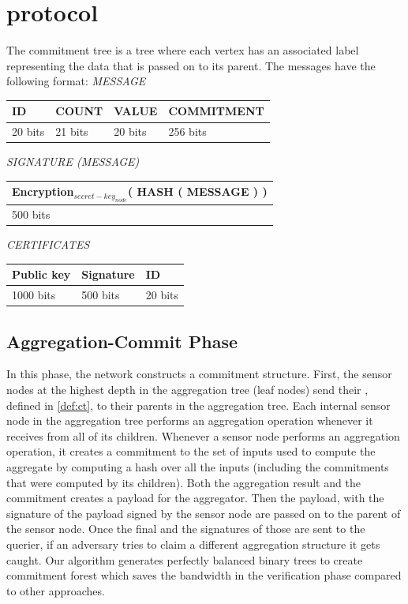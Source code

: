 \chapter{protocol}

	The commitment tree is a tree where each vertex has an associated label representing the data that is passed on to its parent. The messages have the following format: 
	\textit{MESSAGE}
	\newline
	
	\begin{tabular}{ | l | l | l | l |}
		\hline
		ID & COUNT & VALUE & COMMITMENT \\
		\hline
		20 bits & 21 bits & 20 bits & 256 bits\\
		\hline
	\end{tabular}
	\newline
	\newline
	\textit{SIGNATURE (MESSAGE)}
	\newline

	\begin{tabular}{ |l| }
		\hline
		Encryption$_{secret-key_{node}}$( HASH ( MESSAGE ) )\\
		\hline
		500 bits\\
		\hline
	\end{tabular}
	\newline
	\newline
	\textit{CERTIFICATES}
	\newline

	\begin{tabular}{ | l | l | l | }
		\hline
			Public key  & Signature & ID \\
		\hline
			1000 bits & 500 bits & 20 bits \\
		\hline

	\end{tabular}

	\newpage

\section{Aggregation-Commit Phase}
	In this phase, the network constructs a commitment structure. 
	First, the sensor nodes at the highest depth in the aggregation tree (leaf nodes) send their \payloads, defined in \ref{def:ct}, to their parents in the aggregation tree.
	Each internal sensor node in the aggregation tree performs an aggregation operation whenever it receives \payloads from all of its children.
	Whenever a sensor node performs an aggregation operation, it creates a commitment to the set of inputs used to compute the aggregate by computing a hash over all the inputs (including the commitments that were computed by its children). 
	Both the aggregation result and the commitment creates a payload for the aggregator.
	Then the payload, with the signature of the payload signed by the sensor node are passed on to the parent of the sensor node.
	Once the final \payloads and the signatures of those \payloads are sent to the querier, if an adversary tries to claim a different aggregation structure it gets caught.
	Our algorithm generates perfectly balanced binary trees to create commitment forest which saves the bandwidth in the verification phase compared to other approaches.

